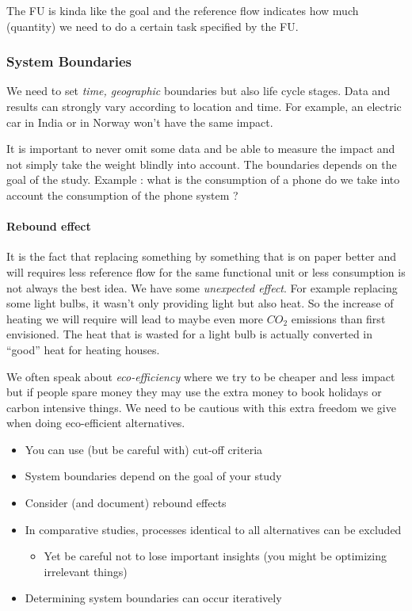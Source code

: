 The FU is kinda like the goal and the reference flow indicates how much
(quantity) we need to do a certain task specified by the FU.

\hypertarget{system-boundaries}{%
\subsubsection{System Boundaries}\label{system-boundaries}}

We need to set \emph{time, geographic} boundaries but also life cycle
stages. Data and results can strongly vary according to location and
time. For example, an electric car in India or in Norway won't have the
same impact.

It is important to never omit some data and be able to measure the
impact and not simply take the weight blindly into account. The
boundaries depends on the goal of the study. Example : what is the
consumption of a phone do we take into account the consumption of the
phone system ?

\hypertarget{rebound-effect}{%
\paragraph{Rebound effect}\label{rebound-effect}}

It is the fact that replacing something by something that is on paper
better and will requires less reference flow for the same functional
unit or less consumption is not always the best idea. We have some
\emph{unexpected effect}. For example replacing some light bulbs, it
wasn't only providing light but also heat. So the increase of heating we
will require will lead to maybe even more \(CO_2\) emissions than first
envisioned. The heat that is wasted for a light bulb is actually
converted in ``good'' heat for heating houses.

We often speak about \emph{eco-efficiency} where we try to be cheaper
and less impact but if people spare money they may use the extra money
to book holidays or carbon intensive things. We need to be cautious with
this extra freedom we give when doing eco-efficient alternatives.

\begin{itemize}
\tightlist
\item
  You can use (but be careful with) cut-off criteria
\item
  System boundaries depend on the goal of your study
\item
  Consider (and document) rebound effects
\item
  In comparative studies, processes identical to all alternatives can be
  excluded

  \begin{itemize}
  \tightlist
  \item
    Yet be careful not to lose important insights (you might be
    optimizing irrelevant things)
  \end{itemize}
\item
  Determining system boundaries can occur iteratively
\end{itemize}

